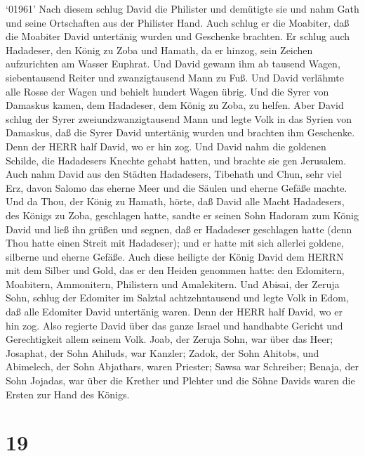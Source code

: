  `01961' Nach diesem schlug David die Philister und
demütigte sie und nahm Gath und seine Ortschaften aus der Philister
Hand.  Auch schlug er die Moabiter, daß die Moabiter David
untertänig wurden und Geschenke brachten.  Er schlug auch
Hadadeser, den König zu Zoba und Hamath, da er hinzog, sein Zeichen
aufzurichten am Wasser Euphrat.  Und David gewann ihm ab
tausend Wagen, siebentausend Reiter und zwanzigtausend Mann zu Fuß. Und
David verlähmte alle Rosse der Wagen und behielt hundert Wagen übrig.
 Und die Syrer von Damaskus kamen, dem Hadadeser, dem König
zu Zoba, zu helfen. Aber David schlug der Syrer zweiundzwanzigtausend
Mann  und legte Volk in das Syrien von Damaskus, daß die
Syrer David untertänig wurden und brachten ihm Geschenke. Denn der HERR
half David, wo er hin zog.  Und David nahm die goldenen
Schilde, die Hadadesers Knechte gehabt hatten, und brachte sie gen
Jerusalem.  Auch nahm David aus den Städten Hadadesers,
Tibehath und Chun, sehr viel Erz, davon Salomo das eherne Meer und die
Säulen und eherne Gefäße machte.  Und da Thou, der König zu
Hamath, hörte, daß David alle Macht Hadadesers, des Königs zu Zoba,
geschlagen hatte,  sandte er seinen Sohn Hadoram zum König
David und ließ ihn grüßen und segnen, daß er Hadadeser geschlagen hatte
(denn Thou hatte einen Streit mit Hadadeser); und er hatte mit sich
allerlei goldene, silberne und eherne Gefäße.  Auch diese
heiligte der König David dem HERRN mit dem Silber und Gold, das er den
Heiden genommen hatte: den Edomitern, Moabitern, Ammonitern, Philistern
und Amalekitern.  Und Abisai, der Zeruja Sohn, schlug der
Edomiter im Salztal achtzehntausend  und legte Volk in
Edom, daß alle Edomiter David untertänig waren. Denn der HERR half
David, wo er hin zog.  Also regierte David über das ganze
Israel und handhabte Gericht und Gerechtigkeit allem seinem Volk.
 Joab, der Zeruja Sohn, war über das Heer; Josaphat, der
Sohn Ahiluds, war Kanzler;  Zadok, der Sohn Ahitobs, und
Abimelech, der Sohn Abjathars, waren Priester; Sawsa war Schreiber;
 Benaja, der Sohn Jojadas, war über die Krether und Plehter
und die Söhne Davids waren die Ersten zur Hand des Königs.

\hypertarget{section-18}{%
\section{19}\label{section-18}}

